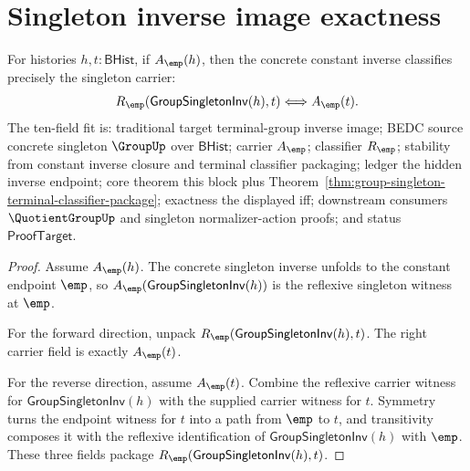 \section{Singleton inverse image exactness}
\label{sec:group-singleton-inverse-image-exactness}

\begin{theorem}
\label{thm:group-singleton-inverse-image-exactness}
For histories $h,t:\mathsf{BHist}$, if $A_{\emp}(h)$, then the concrete
constant inverse classifies precisely the singleton carrier:
$$
R_{\emp}(\mathsf{GroupSingletonInv}(h),t)\Longleftrightarrow A_{\emp}(t).
$$
The ten-field fit is: traditional target terminal-group inverse image; BEDC
source concrete singleton $\GroupUp$ over $\mathsf{BHist}$; carrier
$A_{\emp}$; classifier $R_{\emp}$; stability from constant inverse closure and
terminal classifier packaging; ledger the hidden inverse endpoint; core theorem
this block plus Theorem~\ref{thm:group-singleton-terminal-classifier-package};
exactness the displayed iff; downstream consumers $\QuotientGroupUp$ and
singleton normalizer-action proofs; and status $\mathsf{ProofTarget}$.
\end{theorem}
\begin{proof}
Assume $A_{\emp}(h)$. The concrete singleton inverse unfolds to the constant
endpoint $\emp$, so $A_{\emp}(\mathsf{GroupSingletonInv}(h))$ is the reflexive
singleton witness at $\emp$.

For the forward direction, unpack
$R_{\emp}(\mathsf{GroupSingletonInv}(h),t)$. The right carrier field is exactly
$A_{\emp}(t)$.

For the reverse direction, assume $A_{\emp}(t)$. Combine the reflexive carrier
witness for $\mathsf{GroupSingletonInv}(h)$ with the supplied carrier witness
for $t$. Symmetry turns the endpoint witness for $t$ into a path from $\emp$ to
$t$, and transitivity composes it with the reflexive identification of
$\mathsf{GroupSingletonInv}(h)$ with $\emp$. These three fields package
$R_{\emp}(\mathsf{GroupSingletonInv}(h),t)$.
\end{proof}

